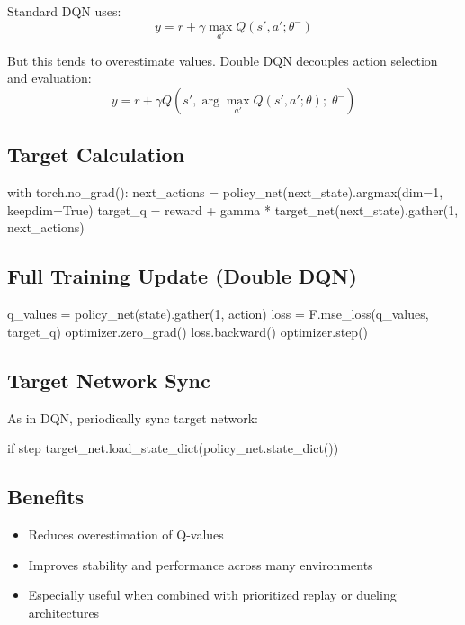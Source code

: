 \documentclass{article}
\begin{document}
Standard DQN uses:
\begin{equation}
    y = r + \gamma \max_{a'} Q(s', a'; \theta^{-})
\end{equation}

But this tends to overestimate values. Double DQN decouples action selection and evaluation:
\begin{equation}
    y = r + \gamma Q(s', \arg\max_{a'} Q(s', a'; \theta);\; \theta^{-})
\end{equation}

\subsection{Target Calculation}

\begin{python}
with torch.no_grad():
    next_actions = policy_net(next_state).argmax(dim=1, keepdim=True)
    target_q = reward + gamma * target_net(next_state).gather(1, next_actions)
\end{python}

\subsection{Full Training Update (Double DQN)}

\begin{python}
q_values = policy_net(state).gather(1, action)
loss = F.mse_loss(q_values, target_q)
optimizer.zero_grad()
loss.backward()
optimizer.step()
\end{python}

\subsection{Target Network Sync}

As in DQN, periodically sync target network:
\begin{python}
if step %
    target_net.load_state_dict(policy_net.state_dict())
\end{python}

\subsection{Benefits}

\begin{itemize}
    \item Reduces overestimation of Q-values
    \item Improves stability and performance across many environments
    \item Especially useful when combined with prioritized replay or dueling architectures
\end{itemize}
\end{document}
